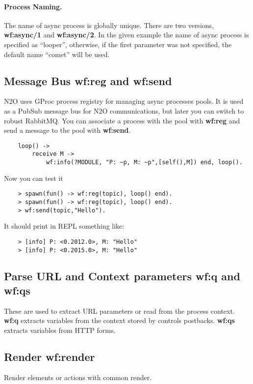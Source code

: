 \paragraph{\bf Process Naming.} The name of async process is globally unique. There are two
versions, {\bf wf:async/1} and {\bf wf:async/2}. In the given example
the name of async process is specified as ``looper'', otherwise,
if the first parameter was not specified, the default name ``comet'' will be used.

\subsection{Message Bus {\bf wf:reg} and {\bf wf:send}}
N2O uses GProc process registry for managing async processes pools.
It is used as a PubSub message bus for N2O communications, but later you can switch to robust RabbitMQ.
You can associate a process with the pool with {\bf wf:reg} and send a message to the pool with {\bf wf:send}.

\vspace{1\baselineskip}
\begin{lstlisting}
    loop() ->
        receive M ->
            wf:info(?MODULE, "P: ~p, M: ~p",[self(),M]) end, loop().
\end{lstlisting}

Now you can test it

\begin{lstlisting}
    > spawn(fun() -> wf:reg(topic), loop() end).
    > spawn(fun() -> wf:reg(topic), loop() end).
    > wf:send(topic,"Hello").
\end{lstlisting}

It should print in REPL something like:

\begin{lstlisting}
    > [info] P: <0.2012.0>, M: "Hello"
    > [info] P: <0.2015.0>, M: "Hello"
\end{lstlisting}

\subsection{Parse URL and Context parameters {\bf wf:q} and {\bf wf:qs}}
These are used to extract URL parameters or read from the process context. {\bf wf:q} extracts variables
from the context stored by controls postbacks. {\bf wf:qs} extracts variables from HTTP forms.

\subsection{Render {\bf wf:render}}
Render elements or actions with common render.

